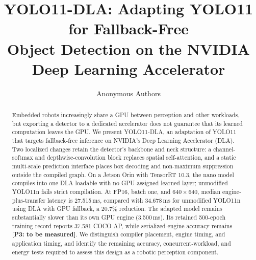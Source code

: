 \documentclass[letterpaper,10pt,conference]{ieeeconf}
\title{\LARGE\bf YOLO11-DLA: Adapting YOLO11 for Fallback-Free\\
Object Detection on the NVIDIA Deep Learning Accelerator}
\author{Anonymous Authors}
\newcommand{\missing}[2]{\textcolor{BrickRed}{\textbf{[#1: #2]}}}
\begin{document}
\maketitle
\thispagestyle{empty}
\pagestyle{empty}
\begin{abstract}
Embedded robots increasingly share a GPU between perception and other workloads,
but exporting a detector to a dedicated accelerator does not guarantee that its
learned computation leaves the GPU. We present YOLO11-DLA, an adaptation of
YOLO11 that targets fallback-free inference on NVIDIA's Deep Learning
Accelerator (DLA). Two localized changes retain the detector's backbone and
neck structure: a channel-softmax and depthwise-convolution block replaces
spatial self-attention, and a static multi-scale prediction interface places
box decoding and non-maximum suppression outside the compiled graph. On a
Jetson Orin with TensorRT 10.3, the nano model compiles into one DLA loadable
with no GPU-assigned learned layer; unmodified YOLO11n fails strict
compilation. At FP16, batch one, and $640\times640$, median
engine-plus-transfer latency is 27.515\,ms, compared with 34.678\,ms for
unmodified YOLO11n using DLA with GPU fallback, a 20.7\% reduction.
The adapted model remains substantially slower than its own GPU engine
(3.500\,ms). Its retained 500-epoch training record reports 37.581 COCO
AP, while serialized-engine accuracy remains
\missing{P3}{to be measured}. We distinguish compiler placement, engine
timing, and application timing, and identify the remaining accuracy,
concurrent-workload, and energy tests required to assess this design as a
robotic perception component.
\end{abstract}










\end{document}
